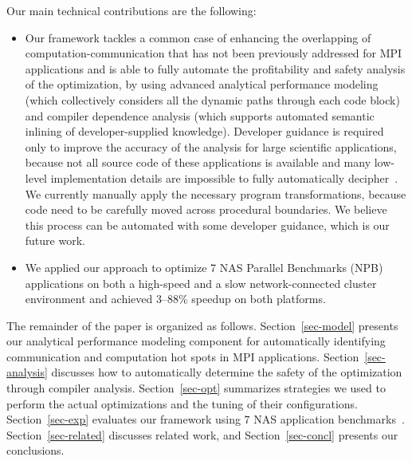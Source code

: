 Our main technical contributions are the following:

\begin{itemize}

\item Our framework tackles a common case of enhancing the overlapping of computation-communication that has not been previously addressed for MPI applications and
is able to fully automate the profitability and safety analysis of the optimization, by using advanced analytical performance
modeling (which collectively considers all the dynamic paths through each code block) and compiler dependence analysis
(which supports automated semantic inlining of developer-supplied knowledge). Developer guidance is required only to improve the
accuracy of the analysis for large scientific applications, because not all source code
of these applications is available and many low-level implementation details are impossible to fully automatically decipher~\cite{POET:ICPP11}.
 We currently manually apply the necessary program transformations,
  because code need to be carefully moved across procedural boundaries. We believe this process can be automated with some developer
guidance, which is our future work.

\item We applied our approach to optimize 7 NAS Parallel Benchmarks
  (NPB) applications on both a high-speed and a slow network-connected
  cluster environment and achieved 3--88\% speedup on both platforms.

\end{itemize}


The remainder of the paper is organized as follows.
Section~\ref{sec-model} presents our analytical performance modeling
component for automatically identifying communication and computation
hot spots in MPI applications. Section~\ref{sec-analysis} discusses how
to automatically determine the safety of the optimization through
compiler analysis.  Section~\ref{sec-opt} summarizes strategies we
used to perform the actual optimizations and the tuning of their
configurations.  Section~\ref{sec-exp} evaluates our framework using 7
NAS application benchmarks~\cite{npb}.  Section~\ref{sec-related}
discusses related work, and Section~\ref{sec-concl} presents our
conclusions.
